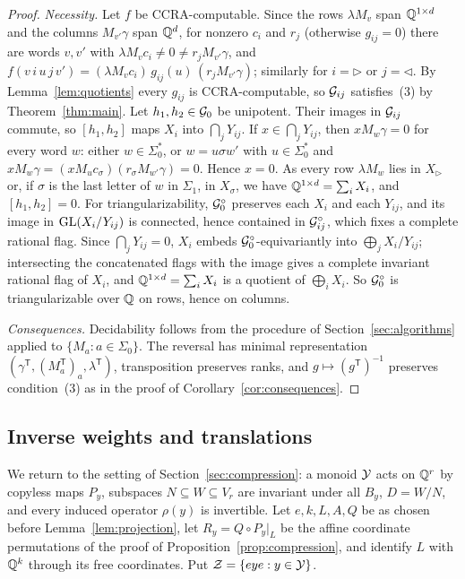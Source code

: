 \begin{proof}
\emph{Necessity.} Let $f$ be CCRA-computable. Since the rows $\lambda M_v$ span $\mathbb{Q}^{1\times d}$ and the columns $M_{v'}\gamma$ span $\mathbb{Q}^d$, for nonzero $c_i$ and $r_j$ (otherwise $g_{ij}=0$) there are words $v,v'$ with $\lambda M_vc_i\ne0\ne r_jM_{v'}\gamma$, and $f(v\,i\,u\,j\,v')=(\lambda M_vc_i)\,g_{ij}(u)\,(r_jM_{v'}\gamma)$; similarly for $i=\triangleright$ or $j=\triangleleft$. By Lemma~\ref{lem:quotients} every $g_{ij}$ is CCRA-computable, so $\mathcal{G}_{ij}$ satisfies~(3) by Theorem~\ref{thm:main}. Let $h_1,h_2\in\mathcal{G}_0$ be unipotent. Their images in $\mathcal{G}_{ij}$ commute, so $[h_1,h_2]$ maps $X_i$ into $\bigcap_jY_{ij}$. If $x\in\bigcap_jY_{ij}$, then $xM_w\gamma=0$ for every word $w$: either $w\in\Sigma_0^*$, or $w=u\sigma w'$ with $u\in\Sigma_0^*$ and $xM_w\gamma=(xM_uc_\sigma)(r_\sigma M_{w'}\gamma)=0$. Hence $x=0$. As every row $\lambda M_w$ lies in $X_\triangleright$ or, if $\sigma$ is the last letter of $w$ in $\Sigma_1$, in $X_\sigma$, we have $\mathbb{Q}^{1\times d}=\sum_iX_i$, and $[h_1,h_2]=0$. For triangularizability, $\mathcal{G}_0^\circ$ preserves each $X_i$ and each $Y_{ij}$, and its image in $\mathrm{GL}(X_i/Y_{ij})$ is connected, hence contained in $\mathcal{G}_{ij}^\circ$, which fixes a complete rational flag. Since $\bigcap_jY_{ij}=0$, $X_i$ embeds $\mathcal{G}_0^\circ$-equivariantly into $\bigoplus_jX_i/Y_{ij}$; intersecting the concatenated flags with the image gives a complete invariant rational flag of $X_i$, and $\mathbb{Q}^{1\times d}=\sum_iX_i$ is a quotient of $\bigoplus_iX_i$. So $\mathcal{G}_0^\circ$ is triangularizable over $\mathbb{Q}$ on rows, hence on columns.

\emph{Consequences.} Decidability follows from the procedure of Section~\ref{sec:algorithms} applied to $\{M_a:a\in\Sigma_0\}$. The reversal has minimal representation $(\gamma^{\mathsf T},(M_a^{\mathsf T})_a,\lambda^{\mathsf T})$, transposition preserves ranks, and $g\mapsto(g^{\mathsf T})^{-1}$ preserves condition~(3) as in the proof of Corollary~\ref{cor:consequences}.
\end{proof}

\subsection{Inverse weights and translations}
We return to the setting of Section~\ref{sec:compression}: a monoid $\mathcal{Y}$ acts on $\mathbb{Q}^r$ by copyless maps $P_y$, subspaces $N\subseteq W\subseteq V_r$ are invariant under all $B_y$, $D=W/N$, and every induced operator $\rho(y)$ is invertible. Let $e,k,L,A,Q$ be as chosen before Lemma~\ref{lem:projection}, let $R_y=Q\circ P_y|_L$ be the affine coordinate permutations of the proof of Proposition~\ref{prop:compression}, and identify $L$ with $\mathbb{Q}^k$ through its free coordinates. Put $\mathcal{Z}=\{eye:y\in\mathcal{Y}\}$.

